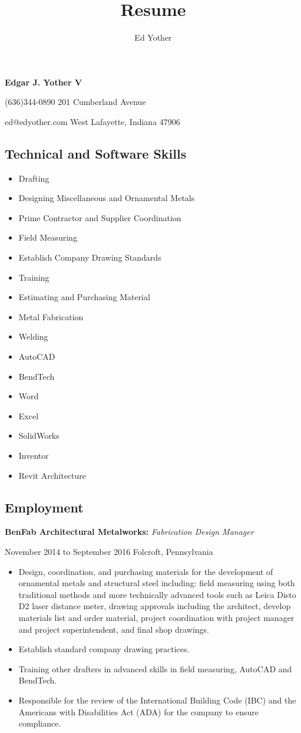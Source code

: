 \documentclass[9pt]{extarticle}
\title{Resume}
\author{Ed Yother}
\begin{document}
\begin{center}
    \textbf{Edgar J. Yother V}
\end{center}
(636)344-0890 \hfill 201 Cumberland Avenue 

ed@edyother.com \hfill West Lafayette, Indiana 47906 


\subsection*{Technical and Software Skills}
\begin{itemize}
    \item Drafting
    \item Designing Miscellaneous and Ornamental Metals 
    \item Prime Contractor and Supplier Coordination  
    \item Field Measuring  
    \item Establish Company Drawing Standards  
    \item Training  
    \item Estimating and Purchasing Material  
    \item Metal Fabrication  
    \item Welding  
    \item AutoCAD  
    \item BendTech  
    \item Word  
    \item Excel  
    \item SolidWorks  
    \item Inventor  
    \item Revit Architecture
\end{itemize}
\subsection*{Employment}
\textbf{BenFab Architectural Metalworks:} \hfill \textit{Fabrication Design Manager}

November 2014 to September 2016 \hfill Folcroft, Pennsylvania

\hfill

\begin{itemize}
    \item Design, coordination, and purchasing materials for the development of ornamental metals and structural steel including: field
measuring using both traditional methods and more technically advanced tools such as Leica Disto D2 laser distance meter,
drawing approvals including the architect, develop materials list and order material, project coordination with project manager
and project superintendent, and final shop drawings.
\item Establish standard company drawing practices.
\item Training other drafters in advanced skills in field measuring, AutoCAD and BendTech.
\item Responsible for the review of the International Building Code (IBC) and the Americans with Disabilities Act (ADA) for the
company to ensure compliance.
\end{itemize}
\end{document}
